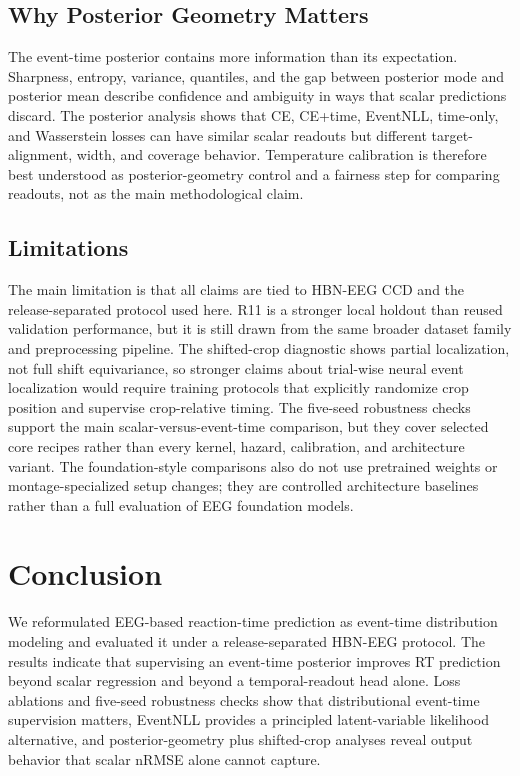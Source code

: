 \documentclass[12pt]{article}
\begin{document}
\subsection{Why Posterior Geometry Matters}

The event-time posterior contains more information than its expectation. Sharpness, entropy, variance, quantiles, and the gap between posterior mode and posterior mean describe confidence and ambiguity in ways that scalar predictions discard. The posterior analysis shows that CE, CE+time, EventNLL, time-only, and Wasserstein losses can have similar scalar readouts but different target-alignment, width, and coverage behavior. Temperature calibration is therefore best understood as posterior-geometry control and a fairness step for comparing readouts, not as the main methodological claim.

\subsection{Limitations}

The main limitation is that all claims are tied to HBN-EEG CCD and the release-separated protocol used here. R11 is a stronger local holdout than reused validation performance, but it is still drawn from the same broader dataset family and preprocessing pipeline. The shifted-crop diagnostic shows partial localization, not full shift equivariance, so stronger claims about trial-wise neural event localization would require training protocols that explicitly randomize crop position and supervise crop-relative timing. The five-seed robustness checks support the main scalar-versus-event-time comparison, but they cover selected core recipes rather than every kernel, hazard, calibration, and architecture variant. The foundation-style comparisons also do not use pretrained weights or montage-specialized setup changes; they are controlled architecture baselines rather than a full evaluation of EEG foundation models.

\section{Conclusion}

We reformulated EEG-based reaction-time prediction as event-time distribution modeling and evaluated it under a release-separated HBN-EEG protocol. The results indicate that supervising an event-time posterior improves RT prediction beyond scalar regression and beyond a temporal-readout head alone. Loss ablations and five-seed robustness checks show that distributional event-time supervision matters, EventNLL provides a principled latent-variable likelihood alternative, and posterior-geometry plus shifted-crop analyses reveal output behavior that scalar nRMSE alone cannot capture.
\end{document}
